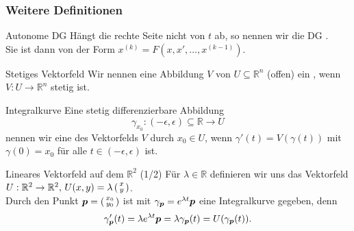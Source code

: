 \subsubsection{Weitere Definitionen}
\begin{Def}
{Autonome DG}
Hängt die rechte Seite nicht von $t$ ab, so nennen wir die DG .\\
Sie ist dann von der Form $x^{(k)}=F(x,x',\ldots,x^{(k-1)})$.
\end{Def}
\begin{Def}
{Stetiges Vektorfeld}
Wir nennen eine Abbildung $V$ von $U\subseteq \mathbb{R}^n$ (offen) ein , wenn $V:U\to\mathbb{R}^n$ stetig ist.
\end{Def}
\begin{Def}
{Integralkurve}
Eine stetig differenzierbare Abbildung
\begin{equation*}
    \gamma_{x_0}:(-\epsilon,\epsilon)\subseteq\mathbb{R}\to U
\end{equation*}
nennen wir eine  des Vektorfelds $V$ durch $x_0\in U$, wenn $\gamma'(t)=V(\gamma(t))$ mit $\gamma(0)=x_0$ für alle $t\in(-\epsilon,\epsilon)$ ist.\\
\end{Def}
\begin{Beispiel}
{Lineares Vektorfeld auf dem $\mathbb{R}^2$ (1/2)}
Für $\lambda\in\mathbb{R}$ definieren wir uns das Vektorfeld $U:\mathbb{R}^2\to\mathbb{R}^2,\,U(x,y)=\lambda\left(\begin{smallmatrix}x\\y\end{smallmatrix}\right)$.\\
Durch den Punkt ${{\text{\boldmath${p}$}}}=\left(\begin{smallmatrix}x_0\\y_0\end{smallmatrix}\right)$ ist mit $\gamma_{{\text{\boldmath${p}$}}}=e^{\lambda t}{{\text{\boldmath${p}$}}}$ eine Integralkurve gegeben, denn
\begin{equation*}
    \gamma'_{{\text{\boldmath${p}$}}}(t)=\lambda e^{\lambda t}{{\text{\boldmath${p}$}}}=\lambda\gamma_{{\text{\boldmath${p}$}}}(t)=U(\gamma_{{\text{\boldmath${p}$}}}(t)).
\end{equation*}
\end{Beispiel}
